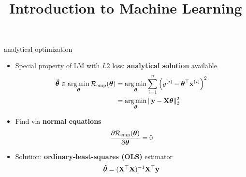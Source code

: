 \documentclass[11pt,compress,t,notes=noshow, xcolor=table]{beamer}
\title{Introduction to Machine Learning}
\begin{document}



\begin{vbframe}{analytical optimization}

\begin{itemize}
    \item Special property of LM with $L2$ loss: \textbf{analytical solution}
    available
    \begin{align*}
        \bm{\hat\theta} \in 
        \operatorname*{arg\,min}_{\bm{\theta}} \mathcal{R}_{\text{emp}}(\bm{\theta}) &=
        \operatorname*{arg\,min}_{\bm{\theta}} \sum\limits_{i=1}^n \left(y^{(i)} - \bm{\theta}^\top \mathbf{x}^{(i)} \right)^2  \\
        &= \operatorname*{arg\,min}_{\bm{\theta}} \| \mathbf{y} - \mathbf{X} \bm{\theta} \|^2_2
    \end{align*}
    \normalsize
    \item Find via \textbf{normal equations}
    $$\frac{\partial{\mathcal{R}_{\text{emp}}(\bm{\theta})}}{\partial \bm{\theta}} = 0$$
    \item Solution: \textbf{ordinary-least-squares (OLS)} estimator
    $$\bm{\hat\theta} = (\mathbf{X}^\top \mathbf{X})^{-1} \mathbf{X}^\top \mathbf{y}$$
\end{itemize}

\end{vbframe}

\end{document}
